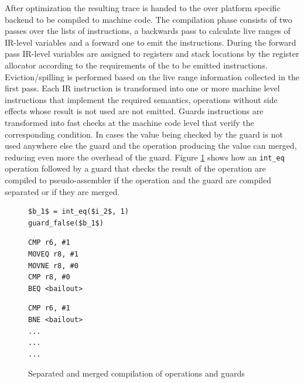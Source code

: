\documentclass[10pt,preprint]{sigplanconf}
\begin{document}
After optimization the resulting trace is handed to the over platform specific
backend to be compiled to machine code. The compilation phase consists of two
passes over the lists of instructions, a backwards pass to calculate live
ranges of IR-level variables and a forward one to emit the instructions. During
the forward pass IR-level variables are assigned to registers and stack
locations by the register allocator according to the requirements of the to be
emitted instructions.  Eviction/spilling is performed based on the live range
information collected in the first pass. Each IR instruction is transformed
into one or more machine level instructions that implement the required
semantics, operations without side effects whose result is not used are not
emitted. Guards instructions are transformed into fast checks at the machine
code level that verify the corresponding condition.  In cases the value being
checked by the guard is not used anywhere else the guard and the operation
producing the value can merged, reducing even more the overhead of the guard.
Figure \ref{fig:trace-compiled} shows how an \texttt{int\_eq} operation
followed by a guard that checks the result of the operation are compiled to
pseudo-assembler if the operation and the guard are compiled separated or if
they are merged.

\begin{figure}[ht]
  \noindent
  \centering
  \begin{minipage}{1\columnwidth}
    \begin{lstlisting}[mathescape]
$b_1$ = int_eq($i_2$, 1)
guard_false($b_1$)
    \end{lstlisting}
  \end{minipage}
  \begin{minipage}{.40\columnwidth}
    \begin{lstlisting}
CMP r6, #1
MOVEQ r8, #1
MOVNE r8, #0
CMP r8, #0
BEQ <bailout>
    \end{lstlisting}
  \end{minipage}
  \hfill
  \begin{minipage}{.40\columnwidth}
    \begin{lstlisting}
CMP r6, #1
BNE <bailout>
...
...
...
    \end{lstlisting}
  \end{minipage}
  \caption{Separated and merged compilation of operations and guards}
  \label{fig:trace-compiled}
\end{figure}
\end{document}
